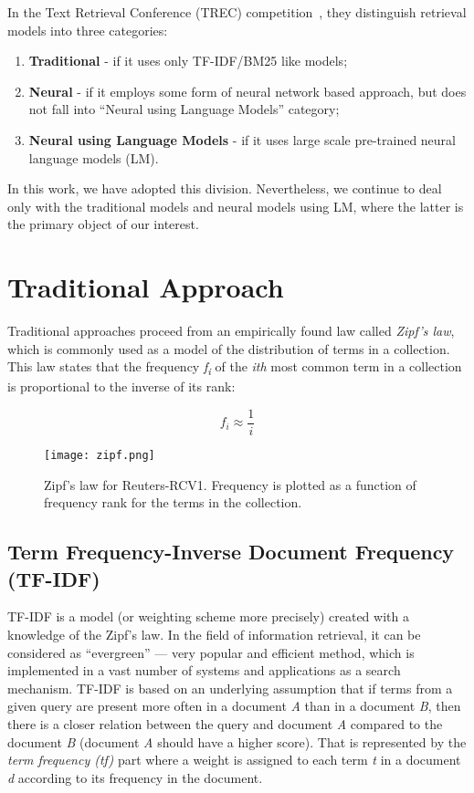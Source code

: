     In the Text Retrieval Conference (TREC) competition~\parencite{trec2020overview}, they distinguish retrieval models into three categories:
    \begin{enumerate}
        \item \textbf{Traditional} - if it uses only TF-IDF/BM25 like models;
        \item \textbf{Neural} - if it employs some form of neural network based approach, but does not fall into \enquote{Neural using Language Models} category;
        \item \textbf{Neural using Language Models} - if it uses large scale pre-trained neural language models (LM).
    \end{enumerate}
    \noindent In this work, we have adopted this division. Nevertheless, we continue to deal only with the traditional models and neural models using LM, where the latter is the primary object of our interest.

\section{Traditional Approach}
\label{section:traditional-approach}
    Traditional approaches proceed from an empirically found law called \emph{Zipf's law}, which is commonly used as a model of the distribution of terms in a collection. This law
    states that the frequency  \emph{f\textsubscript{i}} of the \emph{ith} most common term in a collection is proportional to the inverse of its rank:
    
    \begin{equation}
        f_{i} \approx \frac{1}{i}
    \end{equation}
    
    \begin{figure}[H]
        \texttt{[image: zipf.png]}
        \centering
        \caption[Zipf’s law]{Zipf’s law for Reuters-RCV1. Frequency is plotted as a function of frequency rank for the terms in the collection.~\parencite{manning2008introduction}}
        \label{fig:zipf}
    \end{figure}

\subsection{Term Frequency-Inverse Document Frequency (TF-IDF)}
\label{section:tf-idf}
    TF-IDF is a model (or weighting scheme more precisely) created with a knowledge of the Zipf's law. In the field of information retrieval, it can be considered as \enquote{evergreen} --- very popular and efficient method, which is implemented in a vast number of systems and applications as a search mechanism. TF-IDF is based on an underlying assumption that if terms from a given query are present more often in a document \emph{A} than in a document \emph{B}, then there is a closer relation between the query and document \emph{A} compared to the document \emph{B} (document \emph{A} should have a higher score). That is represented by the \emph{term frequency (tf)} part where a weight is assigned to each term \emph{t} in a document \emph{d} according to its frequency in the document.
    
